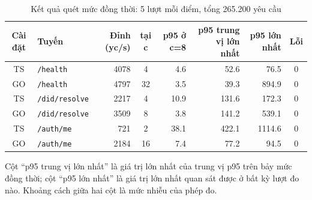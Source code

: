 \begin{table}[H]
\centering
\caption{Kết quả quét mức đồng thời: 5 lượt mỗi điểm, tổng 265.200 yêu cầu}
\label{tab:bench-sweep}
\renewcommand{\arraystretch}{1.2}
\footnotesize
\begin{tabular}{|c|l|r|c|r|r|r|c|}
\hline
\textbf{Cài đặt} & \textbf{Tuyến} & \textbf{Đỉnh (yc/s)} & \textbf{tại c} & \textbf{p95 ở c=8} & \textbf{p95 trung vị lớn nhất} & \textbf{p95 lớn nhất} & \textbf{Lỗi} \\
\hline
TS & \texttt{/health} & 4078 & 4 & 4.6 & 52.6 & 76.5 & 0 \\
GO & \texttt{/health} & 4797 & 32 & 3.5 & 39.3 & 894.9 & 0 \\
TS & \texttt{/did/resolve} & 2217 & 4 & 10.9 & 131.6 & 172.3 & 0 \\
GO & \texttt{/did/resolve} & 3509 & 8 & 3.8 & 141.2 & 539.1 & 0 \\
TS & \texttt{/auth/me} & 721 & 2 & 38.1 & 422.1 & 1114.6 & 0 \\
GO & \texttt{/auth/me} & 2184 & 16 & 7.4 & 77.2 & 94.5 & 0 \\
\hline
\end{tabular}

\vspace{0.2cm}
\begin{minipage}{0.95\textwidth}
\footnotesize
Cột {``}p95 trung vị lớn nhất{''} là giá trị lớn nhất của trung vị p95 trên bảy mức đồng thời; cột {``}p95 lớn nhất{''} là giá trị lớn nhất quan sát được ở bất kỳ lượt đo nào. Khoảng cách giữa hai cột là mức nhiễu của phép đo.
\end{minipage}
\end{table}
